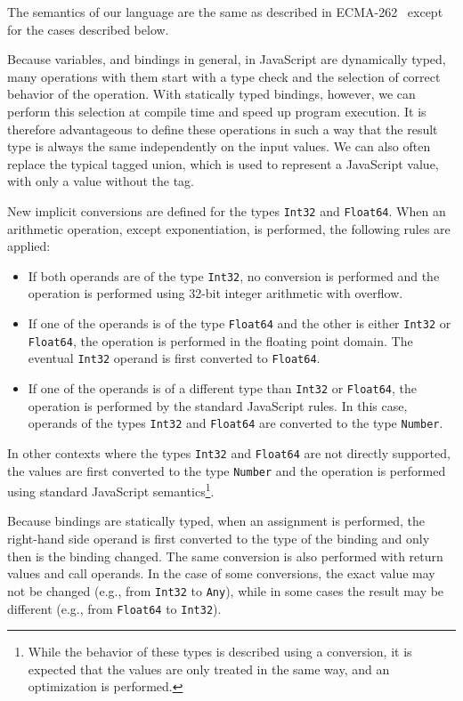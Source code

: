 The semantics of our language are the same as described in ECMA-262~\cite{ecma262} except for the cases described below.

Because variables, and bindings in general, in JavaScript are dynamically typed, many operations with them start with a type check and the selection of correct behavior of the operation. With statically typed bindings, however, we can perform this selection at compile time and speed up program execution. It is therefore advantageous to define these operations in such a way that the result type is always the same independently on the input values. We can also often replace the typical tagged union, which is used to represent a JavaScript value, with only a value without the tag.

New implicit conversions are defined for the types \texttt{Int32} and \texttt{Float64}. When an arithmetic operation, except exponentiation, is performed, the following rules are applied:

\begin{itemize}
    \item If both operands are of the type \texttt{Int32}, no conversion is performed and the operation is performed using 32-bit integer arithmetic with overflow.
    \item If one of the operands is of the type \texttt{Float64} and the other is either \texttt{Int32} or \texttt{Float64}, the operation is performed in the floating point domain. The eventual \texttt{Int32} operand is first converted to \texttt{Float64}.
    \item If one of the operands is of a different type than \texttt{Int32} or \texttt{Float64}, the operation is performed by the standard JavaScript rules. In this case, operands of the types \texttt{Int32} and \texttt{Float64} are converted to the type \texttt{Number}.
\end{itemize}

In other contexts where the types \texttt{Int32} and \texttt{Float64} are not directly supported, the values are first converted to the type \texttt{Number} and the operation is performed using standard JavaScript semantics\footnote{While the behavior of these types is described using a conversion, it is expected that the values are only treated in the same way, and an optimization is performed.}.

Because bindings are statically typed, when an assignment is performed, the right-hand side operand is first converted to the type of the binding and only then is the binding changed. The same conversion is also performed with return values and call operands. In the case of some conversions, the exact value may not be changed (e.g., from \texttt{Int32} to \texttt{Any}), while in some cases the result may be different (e.g., from \texttt{Float64} to \texttt{Int32}).
